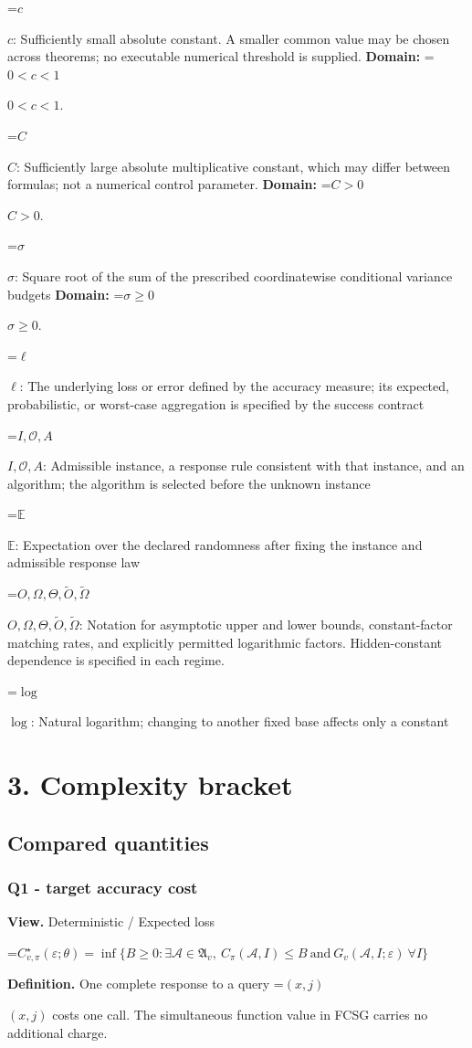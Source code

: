 \documentclass[10pt,a4paper]{article}
\newcommand{\AtlasMath}[1]{\par\begingroup\centering\setbox0=\hbox{$\displaystyle #1$}\ifdim\wd0>1.4\linewidth\typeout{ATLAS WIDE FORMULA: \the\wd0}\fi\ifdim\wd0>\linewidth\resizebox{\linewidth}{!}{\box0}\else\box0\fi\par\endgroup}
\newcommand{\AtlasInlineMath}[1]{\begingroup\setbox0=\hbox{$#1$}\ifdim\wd0>.4\linewidth\endgroup\AtlasMath{#1}\else\endgroup$#1$\fi}
\begin{document}
\AtlasInlineMath{c}: Sufficiently small absolute constant. A smaller common value may be chosen across theorems; no executable numerical threshold is supplied. \textbf{Domain:} \AtlasInlineMath{0<c<1}.

\AtlasInlineMath{C}: Sufficiently large absolute multiplicative constant, which may differ between formulas; not a numerical control parameter. \textbf{Domain:} \AtlasInlineMath{C>0}.

\AtlasInlineMath{\sigma}: Square root of the sum of the prescribed coordinatewise conditional variance budgets \textbf{Domain:} \AtlasInlineMath{\sigma\ge0}.

\AtlasInlineMath{\ell}: The underlying loss or error defined by the accuracy measure; its expected, probabilistic, or worst-case aggregation is specified by the success contract

\AtlasInlineMath{I,\mathcal{O},A}: Admissible instance, a response rule consistent with that instance, and an algorithm; the algorithm is selected before the unknown instance

\AtlasInlineMath{\mathbb{E}}: Expectation over the declared randomness after fixing the instance and admissible response law

\AtlasInlineMath{O,\Omega,\Theta,\widetilde{O},\widetilde\Omega}: Notation for asymptotic upper and lower bounds, constant-factor matching rates, and explicitly permitted logarithmic factors. Hidden-constant dependence is specified in each regime.

\AtlasInlineMath{\log}: Natural logarithm; changing to another fixed base affects only a constant

\section{3. Complexity bracket}
\subsection{Compared quantities}
\subsubsection{Q1 - target accuracy cost}
\textbf{View.} Deterministic / Expected loss

\AtlasMath{C^\star_{v,\pi}(\varepsilon;\theta)=\inf\{B\ge0:\exists\mathcal A\in\mathfrak A_v,\ C_\pi(\mathcal A,I)\le B\ \text{and}\ G_v(\mathcal A,I;\varepsilon)\ \forall I\}}
\textbf{Definition.} One complete response to a query \AtlasInlineMath{(x,j)} costs one call. The simultaneous function value in FCSG carries no additional charge.
\end{document}
